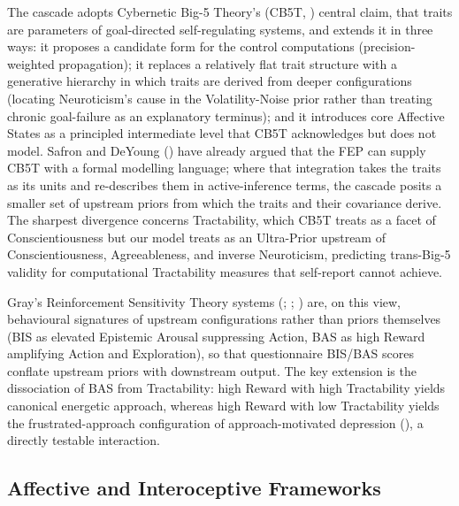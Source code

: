 \documentclass[
  jou,
  floatsintext,
  longtable,
  nolmodern,
  notxfonts,
  notimes,
  12pt,
  colorlinks=true,linkcolor=blue,citecolor=blue,urlcolor=blue]{apa7}
\begin{document}
The cascade adopts Cybernetic Big-5 Theory's (CB5T,
) central claim, that
traits are parameters of goal-directed self-regulating systems, and
extends it in three ways: it proposes a candidate form for the control
computations (precision-weighted propagation); it replaces a relatively
flat trait structure with a generative hierarchy in which traits are
derived from deeper configurations (locating Neuroticism's cause in the
Volatility-Noise prior rather than treating chronic goal-failure as an
explanatory terminus); and it introduces core Affective States as a
principled intermediate level that CB5T acknowledges but does not model.
Safron and DeYoung () have
already argued that the FEP can supply CB5T with a formal modelling
language; where that integration takes the traits as its units and
re-describes them in active-inference terms, the cascade posits a
smaller set of upstream priors from which the traits and their
covariance derive. The sharpest divergence concerns Tractability, which
CB5T treats as a facet of Conscientiousness but our model treats as an
Ultra-Prior upstream of Conscientiousness, Agreeableness, and inverse
Neuroticism, predicting trans-Big-5 validity for computational
Tractability measures that self-report cannot achieve.

Gray's Reinforcement Sensitivity Theory systems
(;
;
) are, on
this view, behavioural signatures of upstream configurations rather than
priors themselves (BIS as elevated Epistemic Arousal suppressing Action,
BAS as high Reward amplifying Action and Exploration), so that
questionnaire BIS/BAS scores conflate upstream priors with downstream
output. The key extension is the dissociation of BAS from Tractability:
high Reward with high Tractability yields canonical energetic approach,
whereas high Reward with low Tractability yields the frustrated-approach
configuration of approach-motivated depression
(), a directly testable
interaction.

\subsection{Affective and Interoceptive
Frameworks}\label{affective-and-interoceptive-frameworks}
\end{document}
